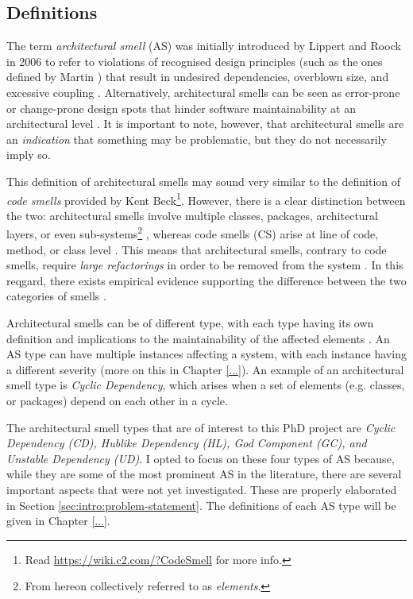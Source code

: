 \subsection{Definitions}
The term \emph{architectural smell} (AS) was initially introduced by Lippert and Roock in 2006 \cite{Lippert2006} to refer to violations of recognised design principles (such as the ones defined by Martin \cite{Martin2018}) that result in undesired dependencies, overblown size, and excessive coupling \cite{Garcia2009}.
Alternatively, architectural smells can be seen as error-prone or change-prone design spots that hinder software maintainability at an architectural level \cite{Mo2015}.
It is important to note, however, that architectural smells are an \emph{indication} that something may be problematic, but they do not necessarily imply so.

This definition of architectural smells may sound very similar to the definition of \emph{code smells} provided by Kent Beck\footnote{Read \url{https://wiki.c2.com/?CodeSmell} for more info.}. However, there is a clear distinction between the two: architectural smells involve multiple classes, packages, architectural layers, or even sub-systems\footnote{From hereon collectively referred to as \emph{elements}.} \cite{Lippert2006}, whereas code smells (CS) arise at line of code, method, or class level \cite{Fowler2002}. 
This means that architectural smells, contrary to code smells, require \emph{large refactorings} in order to be removed from the system \cite{Lippert2006}.
In this reqgard, there exists empirical evidence supporting the difference between the two categories of smells \cite{Arcelli2019}.

Architectural smells can be of different type, with each type having its own definition and implications to the maintainability of the affected elements \cite{Azadi2019}.
An AS type can have multiple instances affecting a system, with each instance having a different severity (more on this in Chapter \ref{...}).
An example of an architectural smell type is \emph{Cyclic Dependency}, which arises when a set of elements (e.g. classes, or packages) depend on each other in a cycle.

The architectural smell types that are of interest to this PhD project are \emph{Cyclic Dependency (CD), Hublike Dependency (HL), God Component (GC), and Unstable Dependency (UD)}.
I opted to focus on these four types of AS because, while they are some of the most prominent AS in the literature, there are several important aspects that were not yet investigated. These are properly elaborated in Section \ref{sec:intro:problem-statement}.
The definitions of each AS type will be given in Chapter \ref{...}.

